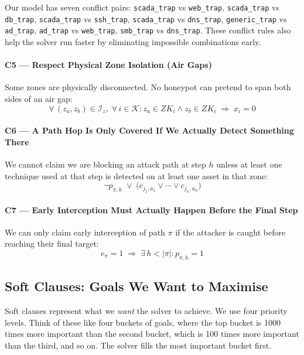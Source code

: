 \documentclass[journal]{IEEEtran}
\newcommand{\calK}{\mathcal{K}}
\begin{document}
Our model has seven conflict pairs:
\texttt{scada\_trap} vs \texttt{web\_trap},
\texttt{scada\_trap} vs \texttt{db\_trap},
\texttt{scada\_trap} vs \texttt{ssh\_trap},
\texttt{scada\_trap} vs \texttt{dns\_trap},
\texttt{generic\_trap} vs \texttt{ad\_trap},
\texttt{ad\_trap} vs \texttt{web\_trap},
\texttt{smb\_trap} vs \texttt{dns\_trap}.
These conflict rules also help the solver run faster by eliminating
impossible combinations early.

\paragraph{C5 --- Respect Physical Zone Isolation (Air Gaps)}
Some zones are physically disconnected. No honeypot can pretend to
span both sides of an air gap:
\begin{equation}
  \forall\,(z_a,z_b) \in \mathcal{I}_z,\;
  \forall\, i \in \calK :
  z_a \in ZK_i \wedge z_b \in ZK_i
  \;\Longrightarrow\; x_i = 0
\end{equation}

\paragraph{C6 --- A Path Hop Is Only Covered If We Actually Detect Something There}
We cannot claim we are blocking an attack path at step $h$ unless
at least one technique used at that step is detected on at least
one asset in that zone:
\begin{equation}
  \neg p_{\pi,h} \;\vee\;
  \bigl(c_{j_1,a_1} \vee \cdots \vee c_{j_n,a_n}\bigr)
\end{equation}

\paragraph{C7 --- Early Interception Must Actually Happen Before the Final Step}
We can only claim early interception of path $\pi$ if the
attacker is caught before reaching their final target:
\begin{equation}
  e_\pi = 1 \;\Longrightarrow\;
  \exists\, h < |\pi| : p_{\pi,h} = 1
\end{equation}

\subsection{Soft Clauses: Goals We Want to Maximise}

Soft clauses represent what we \emph{want} the solver to achieve.
We use four priority levels. Think of these like four buckets of
goals, where the top bucket is 1000 times more important than the
second bucket, which is 100 times more important than the third,
and so on. The solver fills the most important bucket first.
\end{document}
